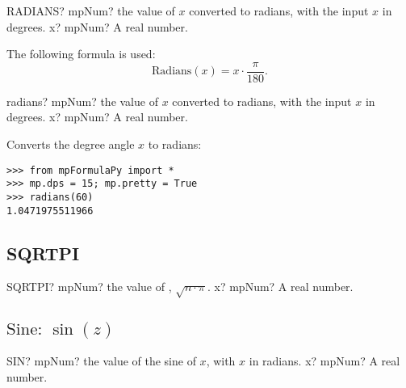 \begin{mpFunctionsExtract}
	\mpWorksheetFunctionOneNotImplemented
	{RADIANS? mpNum? the value of $x$ converted to radians, with the input $x$ in degrees.}
	{x? mpNum? A real number.}
\end{mpFunctionsExtract}

The following formula is used:
\begin{equation}
	\text{Radians}(x) = x \cdot \frac{\pi}{180}.
\end{equation}



\begin{mpFunctionsExtract}
	\mpFunctionOne
	{radians? mpNum? the value of $x$ converted to radians, with the input $x$ in degrees.}
	{x? mpNum? A real number.}
\end{mpFunctionsExtract}

Converts the degree angle $x$ to radians:
\begin{lstlisting}
>>> from mpFormulaPy import *
>>> mp.dps = 15; mp.pretty = True
>>> radians(60)
1.0471975511966
\end{lstlisting}




\subsection{SQRTPI}

\begin{mpFunctionsExtract}
	\mpWorksheetFunctionOneNotImplemented
	{SQRTPI? mpNum? the value of , $\sqrt{n \cdot \pi}$.}
	{x? mpNum? A real number.}
\end{mpFunctionsExtract}







\newpage
\subsection{\texorpdfstring{$\text{Sine: }\sin(z)$}{sin}}

\begin{mpFunctionsExtract}
	\mpWorksheetFunctionOneNotImplemented
	{SIN? mpNum? the value of the sine of $x$, with $x$ in radians.}
	{x? mpNum? A real number.}
\end{mpFunctionsExtract}

